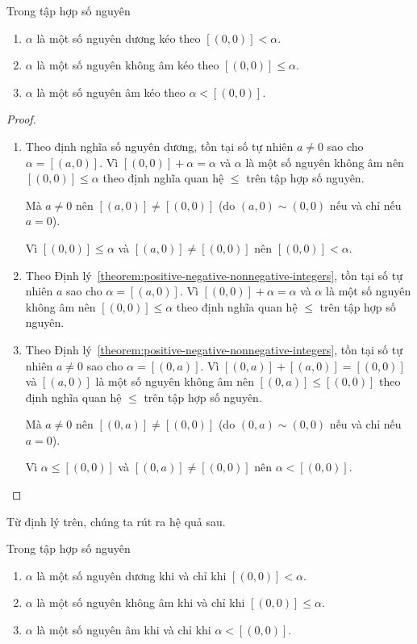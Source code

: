 \begin{theorem}
    Trong tập hợp số nguyên
    \begin{enumerate}[label={(\roman*)}]
        \item $\alpha$ là một số nguyên dương kéo theo $[(0,0)] < \alpha$.
        \item $\alpha$ là một số nguyên không âm kéo theo $[(0,0)] \leq \alpha$.
        \item $\alpha$ là một số nguyên âm kéo theo $\alpha < [(0,0)]$.
    \end{enumerate}
\end{theorem}

\begin{proof}
    \begin{enumerate}[label={(\roman*)}]
        \item Theo định nghĩa số nguyên dương, tồn tại số tự nhiên $a\ne 0$ sao cho $\alpha = [(a, 0)]$. Vì $[(0,0)] + \alpha = \alpha$ và $\alpha$ là một số nguyên không âm nên $[(0,0)]\leq \alpha$ theo định nghĩa quan hệ $\leq$ trên tập hợp số nguyên.

              Mà $a\ne 0$ nên $[(a, 0)]\ne [(0, 0)]$ (do $(a, 0)\sim (0, 0)$ nếu và chỉ nếu $a = 0$).

              Vì $[(0,0)]\leq\alpha$ và $[(a, 0)]\ne [(0,0)]$ nên $[(0,0)] < \alpha$.
        \item Theo Định lý~\ref{theorem:positive-negative-nonnegative-integers}, tồn tại số tự nhiên $a$ sao cho $\alpha = [(a, 0)]$. Vì $[(0,0)] + \alpha = \alpha$ và $\alpha$ là một số nguyên không âm nên $[(0,0)]\leq \alpha$ theo định nghĩa quan hệ $\leq$ trên tập hợp số nguyên.
        \item Theo Định lý~\ref{theorem:positive-negative-nonnegative-integers}, tồn tại số tự nhiên $a\ne 0$ sao cho $\alpha = [(0, a)]$. Vì $[(0,a)] + [(a,0)] = [(0,0)]$ và $[(a, 0)]$ là một số nguyên không âm nên $[(0,a)]\leq [(0,0)]$ theo định nghĩa quan hệ $\leq$ trên tập hợp số nguyên.

              Mà $a\ne 0$ nên $[(0, a)]\ne [(0, 0)]$ (do $(0, a)\sim (0, 0)$ nếu và chỉ nếu $a = 0$).

              Vì $\alpha\leq[(0,0)]$ và $[(0, a)]\ne [(0,0)]$ nên $\alpha < [(0,0)]$.
    \end{enumerate}
\end{proof}

Từ định lý trên, chúng ta rút ra hệ quả sau.
\begin{corollary}\label{corollary:positive-nonnegative-negative-precise-condition}
    Trong tập hợp số nguyên
    \begin{enumerate}[label={(\roman*)}]
        \item $\alpha$ là một số nguyên dương khi và chỉ khi $[(0,0)] < \alpha$.
        \item $\alpha$ là một số nguyên không âm khi và chỉ khi $[(0,0)] \leq \alpha$.
        \item $\alpha$ là một số nguyên âm khi và chỉ khi $\alpha < [(0,0)]$.
    \end{enumerate}
\end{corollary}


